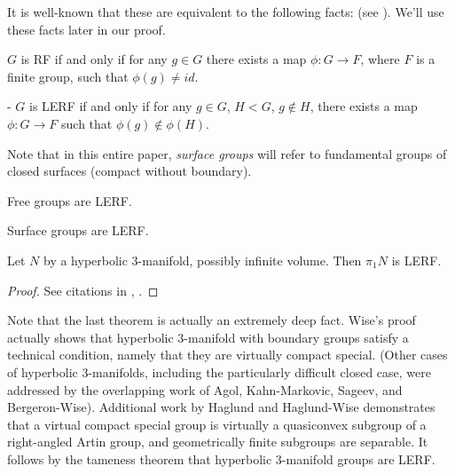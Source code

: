 It is well-known that these are equivalent to the following facts: (see
\cite{LR}). We'll use these facts later in our proof.

$G$ is RF if and only if for any $g \in G$ there exists a map $\phi \colon
G \to F$, where $F$ is a finite group, such that $\phi(g) \neq id$.

- $G$ is LERF if and only if for any $g \in G$, $H < G$, $g \notin H$, there
exists a map $\phi \colon G \to F$ such that $\phi(g) \notin \phi(H)$.

Note that in this entire paper, \emph{surface groups} will refer to fundamental
groups of closed surfaces (compact without boundary).

\begin{thm}[Hall] Free groups are LERF. \end{thm}

\begin{thm}[Scott] Surface groups are LERF. \end{thm}

\begin{thm} Let $N$ by a hyperbolic 3-manifold,
possibly infinite volume.  Then $\pi_1N$ is LERF. \end{thm}

\begin{proof}

See citations in \cite{LR}, \cite{AFW}.

\end{proof}

Note that the last theorem is actually an extremely deep fact. Wise's proof
actually shows that hyperbolic 3-manifold with boundary groups satisfy
a technical condition, namely that they are virtually compact special. (Other
cases of hyperbolic 3-manifolds, including the particularly difficult closed
case, were addressed by the overlapping work of Agol, Kahn-Markovic, Sageev,
and Bergeron-Wise).  Additional work by Haglund and Haglund-Wise demonstrates
that a virtual compact special group is virtually a quasiconvex subgroup of
a right-angled Artin group, and geometrically finite subgroups are separable.
It follows by the tameness theorem that hyperbolic 3-manifold groups are LERF.


